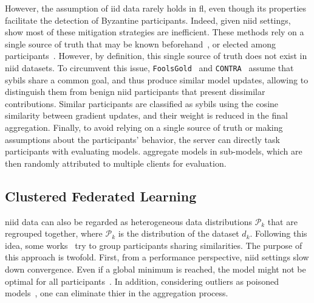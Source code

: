 However, the assumption of \gls{iid} data rarely holds in \gls{fl}, even though its properties facilitate the detection of Byzantine participants.
Indeed, given \gls{niid} settings, \textcite{you_Poisoningattackdetection_2022} show most of these mitigation strategies are inefficient.
These methods rely on a single source of truth that may be known beforehand~\cite{cao_FLTrustByzantinerobustFederated_2022}, or elected among participants~\cite{blanchard_Machinelearningadversaries_2017}.
However, by definition, this single source of truth does not exist in \gls{niid} datasets. 
To circumvent this issue, \texttt{FoolsGold}~\cite{fung_LimitationsFederatedLearning_2020} and \texttt{CONTRA}~\cite{awan_CONTRADefendingPoisoning_2021} assume that sybils share a common goal, and thus produce similar model updates, allowing to distinguish them from benign \gls{niid} participants that present dissimilar contributions. 
Similar participants are classified as sybils using the cosine similarity between gradient updates, and their weight is reduced in the final aggregation. 
Finally, to avoid relying on a single source of truth or making assumptions about the participants' behavior, the server can directly task participants with evaluating models.
\textcite{zhao_ShieldingCollaborativeLearning_2020} aggregate models in sub-models, which are then randomly attributed to multiple clients for evaluation.  


\subsection{Clustered Federated Learning\label{sec:radar.prelim.cluster}}

\Gls{niid} data can also be regarded as heterogeneous data distributions $\mathcal{P}_k$ that are regrouped together, where $\mathcal{P}_k$ is the distribution of the dataset $d_k$.
Following this idea, some works~\cite{briggs_Federatedlearninghierarchical_2020,ouyang_ClusterFLClusteringbasedFederated_2022,ye_PFedSAPersonalizedFederated_2023} try to group participants sharing similarities. 
The purpose of this approach is twofold.
First, from a performance perspective, \gls{niid} settings slow down convergence.
Even if a global minimum is reached, the model might not be optimal for all participants~\cite{kairouz_AdvancesOpenProblems_2021,ouyang_ClusterFLClusteringbasedFederated_2022}.
In addition, considering outliers as poisoned models~\cite{peri_DeepkNNDefense_2020}, one can eliminate thier in the aggregation process.

